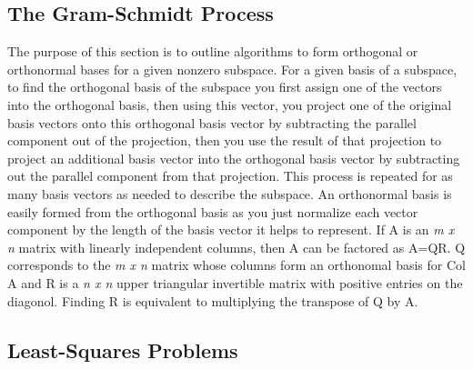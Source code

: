 \documentclass[12pt]{article}
\begin{document}
\subsection{The Gram-Schmidt Process}
The purpose of this section is to outline algorithms to form orthogonal or orthonormal bases for a given nonzero subspace. For a given basis of a subspace, to find the orthogonal basis 
of the subspace you first assign one of the vectors into the orthogonal basis, then using this vector, you project one of the original basis vectors onto this orthogonal basis vector 
by subtracting the parallel component out of the projection, then you use the result of that projection to project an additional basis vector into the orthogonal basis vector by 
subtracting out the parallel component from that projection. This process is repeated for as many basis vectors as needed to describe the subspace. An orthonormal basis is easily formed 
from the orthogonal basis as you just normalize each vector component by the length of the basis vector it helps to represent. 
\newline
\newline
If A is an \textit{m x n} matrix with linearly independent columns, then A can be factored as A=QR. Q corresponds to the \textit{m x n} matrix whose columns form an orthonomal basis for 
Col A and R is a \textit{n x n} upper triangular invertible matrix with positive entries on the diagonol. Finding R is equivalent to multiplying the transpose of Q by A. 
\subsection{Least-Squares Problems}
\end{document}
